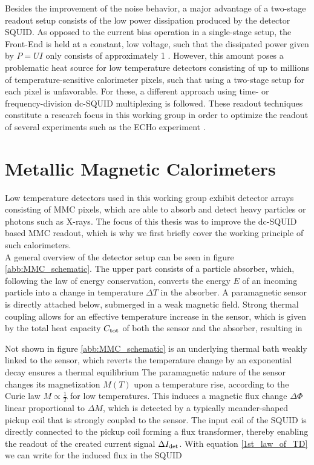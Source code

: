 Besides the improvement of the noise behavior, a major advantage of a two-stage readout setup consists of the low power dissipation produced by the detector SQUID. As opposed to the current bias operation in a single-stage setup, the Front-End is held at a constant, low voltage, such that the dissipated power given by $P=UI$ only consists of approximately \qty{1}{\nW} \cite{Drung2007}. However, this amount poses a problematic heat source for low temperature detectors consisting of up to millions of temperature-sensitive calorimeter pixels, such that using a two-stage setup for each pixel is unfavorable. For these, a different approach using time- or frequency-division dc-SQUID multiplexing is followed. These readout techniques constitute a research focus in this working group in order to optimize the readout of several experiments such as the ECHo experiment \cite{Gastaldo2017}.





\section{Metallic Magnetic Calorimeters} \label{sec_MMC}

Low temperature detectors used in this working group exhibit detector arrays consisting of MMC pixels, which are able to absorb and detect heavy particles or photons such as X-rays. The focus of this thesis was to improve the dc-SQUID based MMC readout, which is why we first briefly cover the working principle of such calorimeters. \\ 
A general overview of the detector setup can be seen in figure \ref{abb:MMC_schematic}. The upper part consists of a particle absorber, which, following the law of energy conservation, converts the energy $E$ of an incoming particle into a change in temperature $\Delta T$ in the absorber. A paramagnetic sensor is directly attached below, submerged in a weak magnetic field. Strong thermal coupling allows for an effective temperature increase in the sensor, which is given by the total heat capacity $C_{\rm tot}$ of both the sensor and the absorber, resulting in 


Not shown in figure \ref{abb:MMC_schematic} is an underlying thermal bath weakly linked to the sensor, which reverts the temperature change by an exponential decay ensures a thermal equilibrium 
The paramagnetic nature of the sensor changes its magnetization $M(T)$ upon a temperature rise, according to the Curie law $M\propto \frac{1}{T}$ for low temperatures. This induces a magnetic flux change $\Delta\Phi$ linear proportional to $\Delta M$, which is detected by a typically meander-shaped pickup coil that is strongly coupled to the sensor. The input coil of the SQUID is directly connected to the pickup coil forming a flux transformer, thereby enabling the readout of the created current signal $\Delta I_{\rm det}$. With equation \ref{1st_law_of_TD} we can write for the induced flux in the SQUID  

